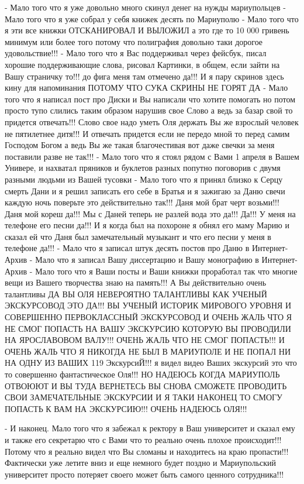 - Мало того что я уже довольно много скинул денег на нужды мариупольцев
- Мало того что я уже собрал у себя книжек десять по Мариуполю
- Мало того что я эти все книжки ОТСКАНИРОВАЛ И ВЫЛОЖИЛ а это где то 10 000 гривень минимум или более того
потому что полиграфия довольно таки дорогое удовольствие!!!
- Мало того что я Вас поддерживал через фейсбук, писал хорошие поддерживающие слова, рисовал Картинки,
в общем, если зайти на Вашу страничку то!!! до фига меня там отмечено да!!! И я пару скринов здесь кину для напоминания 
ПОТОМУ ЧТО СУКА СКРИНЫ НЕ ГОРЯТ ДА
- Мало того что я написал пост про Диски и Вы написали что хотите помогать но потом просто тупо слились таким образом
нарушив свое Слово а ведь за базар свой то придется отвечать!!! Слово свое надо уметь Оля держать Вы же взрослый человек
не пятилетнее дитя!!! И отвечать придется если не передо мной то перед самим Господом Богом а ведь Вы же такая благочестивая вот даже 
свечки за меня поставили разве не так!!!
- Мало того что я стоял рядом с Вами 1 апреля в Вашем Универе, и нахватал пряников и буклетов разных попутно
поговорив с двумя разными людьми из Вашей тусовки
- Мало того что я принял близко к Серцу смерть Дани и я решил записать его себе в Братья и я зажигаю
за Даню свечи каждую ночь поверьте это действительно так!!! Даня мой брат черт возьми!!! Даня мой кореш да!!!
Мы с Даней теперь не разлей вода это да!!! Да!!! У меня на телефоне его песни да!!! И я когда был на похороне
я обнял его маму Марию и сказал ей что Даня был замечательный музыкант и что его песни у меня в телефоне да!!!
- Мало что я записал штук десять постов про Даню в Интернет-Архив
- Мало что я записал Вашу диссертацию и Вашу монографию в Интернет-Архив
- Мало того что я Ваши посты и Ваши книжки проработал так что многие вещи из Вашего творчества знаю
на память!!! А Вы действительно очень талантливы ДА ВЫ ОЛЯ НЕВЕРОЯТНО ТАЛАНТЛИВЫ КАК УЧЕНЫЙ ЭКСКУРСОВОД ЭТО ДА!!!
ВЫ УЧЕНЫЙ ИСТОРИК МИРОВОГО УРОВНЯ И СОВЕРШЕННО ПЕРВОКЛАССНЫЙ ЭКСКУРСОВОД И ОЧЕНЬ ЖАЛЬ ЧТО Я НЕ СМОГ ПОПАСТЬ НА ВАШУ ЭКСКУРСИЮ
КОТОРУЮ ВЫ ПРОВОДИЛИ НА ЯРОСЛАВОВОМ ВАЛУ!!! ОЧЕНЬ ЖАЛЬ ЧТО НЕ СМОГ ПОПАСТЬ!!! И ОЧЕНЬ ЖАЛЬ ЧТО Я НИКОГДА НЕ БЫЛ В МАРИУПОЛЕ
И НЕ ПОПАЛ НИ НА ОДНУ ИЗ ВАШИХ 119 ЭкскурсиЙ!!! я видел видео Ваших экскурсий это что то совершенно фантастическое Оля!!!
НО НАДЕЮСЬ КОГДА МАРИУПОЛЬ ОТВОЮЮТ И ВЫ ТУДА ВЕРНЕТЕСЬ ВЫ СНОВА СМОЖЕТЕ ПРОВОДИТЬ СВОИ ЗАМЕЧАТЕЛЬНЫЕ ЭКСКУРСИИ И Я ТАКИ НАКОНЕЦ ТО
СМОГУ ПОПАСТЬ К ВАМ НА ЭКСКУРСИЮ!!! ОЧЕНЬ НАДЕЮСЬ ОЛЯ!!!

- И наконец. Мало того что я забежал к ректору в Ваш университет и сказал ему и также его секретарю что с Вами что то реально
очень плохое происходит!!! Потому что я реально видел что Вы сломаны и находитесь на краю пропасти!!! Фактически уже летите вниз
и еще немного будет поздно и Мариупольский университет просто потеряет своего может быть самого ценного сотрудника!!!


